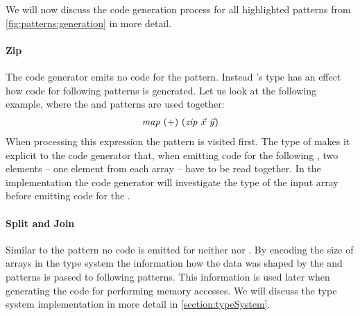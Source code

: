 We will now discuss the code generation process for all highlighted patterns from \autoref{fig:patterns:generation} in more detail.

\paragraph{Zip}
The code generator emits no \OpenCL code for the \zip pattern.
Instead \zip's type has an effect how code for following patterns is generated.
Let us look at the following example, where the \zip and \mapGlobal patterns are used together:
\begin{align}
  \text{\textit{map}}\ (+)\ (\text{\textit{zip}}\ \vec{x}\ \vec{y})
\end{align}
When processing this expression the \zip pattern is visited first.
The type of \zip makes it explicit to the code generator that, when emitting code for the following \mapGlobal, two elements -- one element from each array -- have to be read together.
In the implementation the code generator will investigate the type of the input array before emitting code for the \mapGlobal.

\paragraph{Split and Join}
Similar to the \zip pattern no \OpenCL code is emitted for neither \splitN nor \join.
By encoding the size of arrays in the type system the information how the data was shaped by the \splitN and \join patterns is passed to following patterns.
This information is used later when generating the \OpenCL code for performing \OpenCL memory accesses. 
We will discuss the type system implementation in more detail in \autoref{section:typeSystem}.

